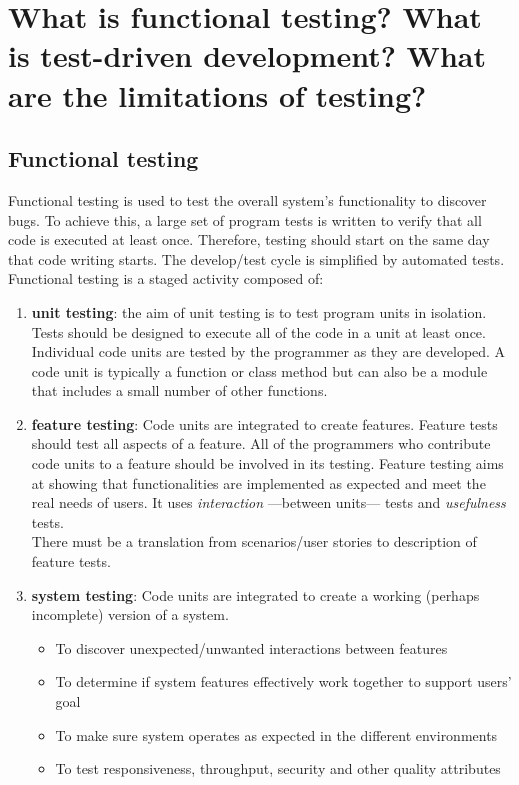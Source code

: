 \section{What is functional testing? What is test-driven development? What are the limitations of testing?}
\subsection{Functional testing}
Functional testing is used to test the overall system's functionality to discover bugs. To achieve this, a large set of program tests is written to verify that all code is executed at least once. Therefore, testing should start on the same day that code writing starts. The develop/test cycle is simplified by automated tests. Functional testing is a staged activity composed of:
\begin{enumerate}
   \item \textbf{unit testing}: the aim of unit testing is to test program units in isolation. Tests should be designed to execute all of the code in a unit at least once. Individual code units are tested by the programmer as they are developed. A code unit is typically a function or class method but can also be a module that includes a small number of other functions.
   \item \textbf{feature testing}:
         Code units are integrated to create features. Feature tests should test all aspects of a feature. All of the programmers who contribute code units to a feature should be involved in its testing. Feature testing aims at showing that functionalities are implemented as expected and meet the real needs of users. It uses \textit{interaction} {---}between units{---} tests and \textit{usefulness} tests.\\
         There must be a translation from scenarios/user stories to description of feature tests.
   \item \textbf{system testing}: Code units are integrated to create a working (perhaps incomplete) version of a system.
         \begin{itemize}
            \item To discover unexpected/unwanted interactions between features
            \item To determine if system features effectively work together to support users' goal
            \item To make sure system operates as expected in the different environments
            \item To test responsiveness, throughput, security and other quality attributes

\end{itemize}
\end{enumerate}
